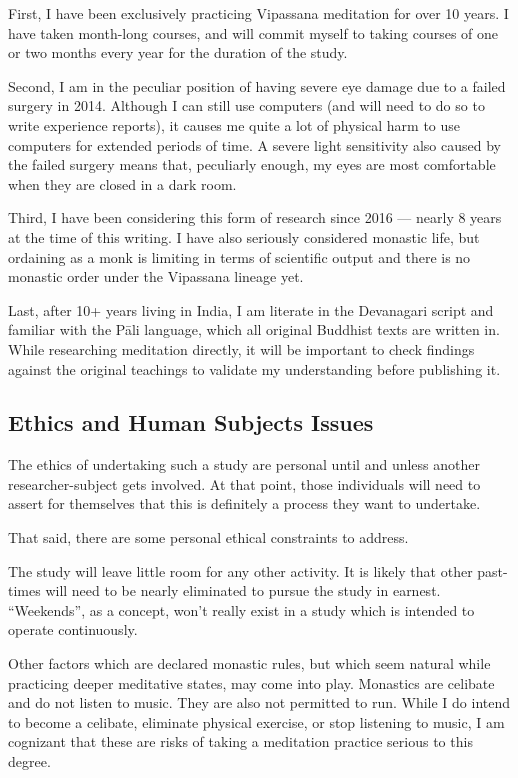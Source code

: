\documentclass[a4paper, amsfonts, amssymb, amsmath, reprint, showkeys, nofootinbib, twoside]{revtex4-1}
\begin{document}
First, I have been exclusively practicing Vipassana meditation for over 10 years.
I have taken month-long courses, and will commit myself to taking courses of
one or two months every year for the duration of the study.

Second, I am in the peculiar position of having severe eye damage due to a failed
surgery in 2014.
Although I can still use computers (and will need to do so to write experience
reports), it causes me quite a lot of physical harm to use computers for
extended periods of time.
A severe light sensitivity also caused by the failed surgery means that, peculiarly
enough, my eyes are most comfortable when they are closed in a dark room.

Third, I have been considering this form of research since 2016
--- nearly 8 years at the time of this writing.
I have also seriously considered monastic life, but ordaining as a monk is limiting
in terms of scientific output and there is no monastic order under the Vipassana
lineage yet.

Last, after 10+ years living in India, I am literate in the Devanagari script and
familiar with the Pāli language, which all original Buddhist texts are written in.
While researching meditation directly, it will be important to check findings
against the original teachings to validate my understanding before publishing it.

\subsection{Ethics and Human Subjects Issues}

The ethics of undertaking such a study are personal until and unless another
researcher-subject gets involved.
At that point, those individuals will need to assert for themselves that this
is definitely a process they want to undertake.

That said, there are some personal ethical constraints to address.

The study will leave little room for any other activity.
It is likely that other past-times will need to be nearly eliminated
to pursue the study in earnest.
``Weekends'', as a concept, won't really exist in a study which is intended
to operate continuously.

Other factors which are declared monastic rules, but which seem natural
while practicing deeper meditative states, may come into play.
Monastics are celibate and do not listen to music.
They are also not permitted to run.
While I do intend to become a celibate, eliminate physical exercise,
or stop listening to music, I am cognizant that these are risks of taking
a meditation practice serious to this degree.
\end{document}
